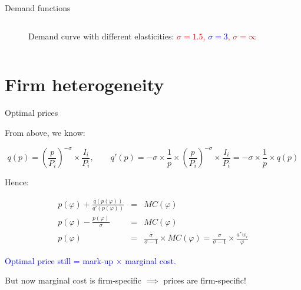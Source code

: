 \documentclass[notes,11pt, aspectratio=169, xcolor=table]{beamer}
\newcommand{\blue}[1]{\textcolor{blue}{#1}}
\newenvironment{wideitemize}{\itemize\addtolength{\itemsep}{10pt}}{\enditemize}
\begin{document}
\begin{frame}{Demand functions}
\begin{columns}
\begin{column}{0.5\textwidth}
{\begin{figure}[htp]
            \caption{Demand curve with different elasticities: \textcolor{red}{$\sigma=1.5$, \textcolor{blue}{$\sigma=3$}, \textcolor{brown}{$\sigma=\infty$}}}
        \label{fig: ces-demand}
    \end{figure}
    
        }

            \end{column}
\end{columns}
\end{frame}

\section{Firm heterogeneity}

\begin{frame}{Optimal prices}

    \begin{wideitemize}
            \item From above, we know:

    \begin{equation*}
        q(p) = \left( \frac{p}{P_i} \right)^{-\sigma} \times \frac{I_i}{P_i}, \qquad q'(p) = -\sigma \times \frac{1}{p} \times \left( \frac{p}{P_i} \right)^{-\sigma} \times \frac{I_i}{P_i}  = -\sigma \times \frac{1}{p} \times q(p) 
    \end{equation*}

    \item<2-> Hence: 

    \begin{eqnarray*}
        p(\varphi) + \frac{q(p(\varphi))}{q'(p(\varphi))} &=& MC(\varphi) \\
        p(\varphi) - \frac{p(\varphi)}{\sigma} &=& MC(\varphi) \\
p(\varphi) &=& \frac{\sigma}{\sigma -1}\times MC(\varphi) = \frac{\sigma}{\sigma -1}\times \frac{a^* w_i}{\varphi}
    \end{eqnarray*}

    \item<3-> \blue{Optimal price still = mark-up $\times$ marginal cost.}

    \item<4-> But now marginal cost is firm-specific $\implies$ prices are firm-specific!

    \end{wideitemize}
\end{frame}
\end{document}
